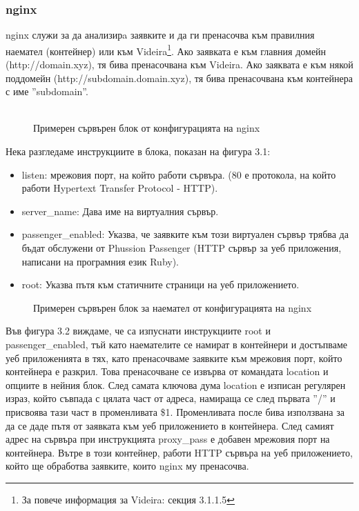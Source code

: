 \documentclass[pdftex,14pt,a4paper]{extreport}
\begin{document}
\subsubsection {nginx}
nginx служи за да анализирa заявките и да ги пренасочва към правилния наемател (контейнер) или към Videira\footnote{За повече информация за Videira: секция 3.1.1.5}. Ако заявката е към главния домейн (http://domain.xyz), тя бива пренасочвана към Videira. Ако заяквата е към някой поддомейн (http://subdomain.domain.xyz), тя бива пренасочвана към контейнера с име ''subdomain''.\\\\
\begin{figure}[h]
  
  \caption{Примерен сървърен блок от конфигурацията на nginx}
\end{figure}
Нека разгледаме инструкциите в блока, показан на фигура 3.1:
\begin{itemize}
  \item listen: мрежовия порт, на който работи сървъра. (80 е протокола, на който работи Hypertext Transfer Protocol - HTTP).
  \item server\_name: Дава име на виртуалния сървър.
  \item passenger\_enabled: Указва, че заявките към този виртуален сървър трябва да бъдат обслужени от Phussion Passenger (HTTP сървър за уеб приложения, написани на програмния език Ruby).
  \item root: Указва пътя към статичните страници на уеб приложението.
\end{itemize}
\begin{figure}[h]
  
  \caption{Примерен сървърен блок за наемател от конфигурацията на nginx}
\end{figure}
Във фигура 3.2 виждаме, че са изпуснати инструкциите root и passenger\_enabled, тъй като наемателите се намират в контейнери и достъпваме уеб приложенията в тях, като пренасочваме заявките към мрежовия порт, който контейнера е разкрил. Това пренасочване се извърва от командата location и опциите в нейния блок. След самата ключова дума location е изписан регулярен израз, който съвпада с цялата част от адреса, намираща се след първата ''/'' и присвоява тази част в променливата \$1. Променливата после бива използвана за да се даде пътя от заявката към уеб приложението в контейнера. След самият адрес на сървъра при инструкцията proxy\_pass е добавен мрежовия порт на контейнера. Вътре в този контейнер, работи HTTP сървъра на уеб приложението, който ще обработва заявките, които nginx му пренасочва.
\end{document}
